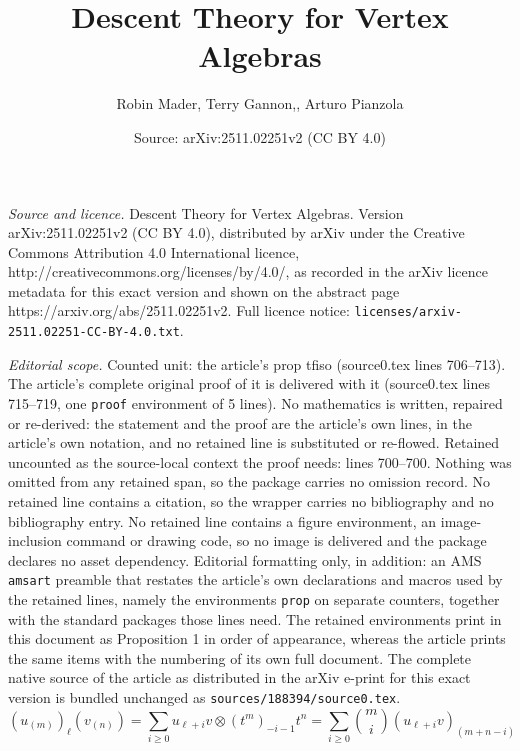 \documentclass[10pt,a4paper]{amsart}
\title{Descent Theory for Vertex Algebras}
\author{Robin Mader, Terry Gannon,, Arturo Pianzola}
\date{Source: arXiv:2511.02251v2 (CC BY 4.0)}
\begin{document}
\maketitle

\noindent\emph{Source and licence.} Descent Theory for Vertex Algebras. Version arXiv:2511.02251v2 (CC BY 4.0), distributed by arXiv under the Creative Commons Attribution 4.0 International licence, http://creativecommons.org/licenses/by/4.0/, as recorded in the arXiv licence metadata for this exact version and shown on the abstract page https://arxiv.org/abs/2511.02251v2. Full licence notice: \texttt{licenses/arxiv-2511.02251-CC-BY-4.0.txt}.\par\smallskip

\noindent\textit{Editorial scope.} Counted unit: the article's prop tfiso (source0.tex lines 706--713). The article's complete original proof of it is delivered with it (source0.tex lines 715--719, one \texttt{proof} environment of 5 lines). No mathematics is written, repaired or re-derived: the statement and the proof are the article's own lines, in the article's own notation, and no retained line is substituted or re-flowed.  Retained uncounted as the source-local context the proof needs: lines 700--700.  Nothing was omitted from any retained span, so the package carries no omission record.  No retained line contains a citation, so the wrapper carries no bibliography and no bibliography entry.  No retained line contains a figure environment, an image-inclusion command or drawing code, so no image is delivered and the package declares no asset dependency.  Editorial formatting only, in addition: an AMS \texttt{amsart} preamble that restates the article's own declarations and macros used by the retained lines, namely the environments \texttt{prop} on separate counters, together with the standard packages those lines need.  The retained environments print in this document as Proposition 1 in order of appearance, whereas the article prints the same items with the numbering of its own full document.  The complete native source of the article as distributed in the arXiv e-print for this exact version is bundled unchanged as \texttt{sources/188394/source0.tex}.
\begin{equation} \label{keyf} (u_{(m)})_\ell(v_{(n)}) = \sum_{i \geq 0} u_{\ell+i} v \otimes (t^m)_{-i-1} t^n = \sum_{i \geq 0} \binom{m}{i} (u_{\ell+i} v)_{(m+n-i)} \end{equation}
\end{document}
